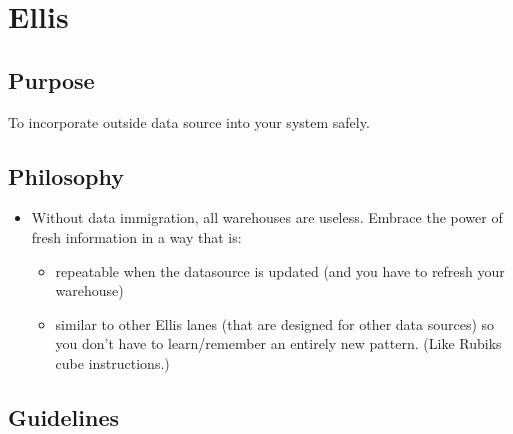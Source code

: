 \documentclass[]{book}
\providecommand{\tightlist}{%
  \setlength{\itemsep}{0pt}\setlength{\parskip}{0pt}}
\begin{document}
\hypertarget{ellis}{%
\section{Ellis}\label{ellis}}

\hypertarget{purpose}{%
\subsection{Purpose}\label{purpose}}

To incorporate outside data source into your system safely.

\hypertarget{philosophy}{%
\subsection{Philosophy}\label{philosophy}}

\begin{itemize}
\tightlist
\item
  Without data immigration, all warehouses are useless. Embrace the power of fresh information in a way that is:

  \begin{itemize}
  \tightlist
  \item
    repeatable when the datasource is updated (and you have to refresh your warehouse)
  \item
    similar to other Ellis lanes (that are designed for other data sources) so you don't have to learn/remember an entirely new pattern. (Like Rubiks cube instructions.)
  \end{itemize}
\end{itemize}

\hypertarget{guidelines}{%
\subsection{Guidelines}\label{guidelines}}
\end{document}
